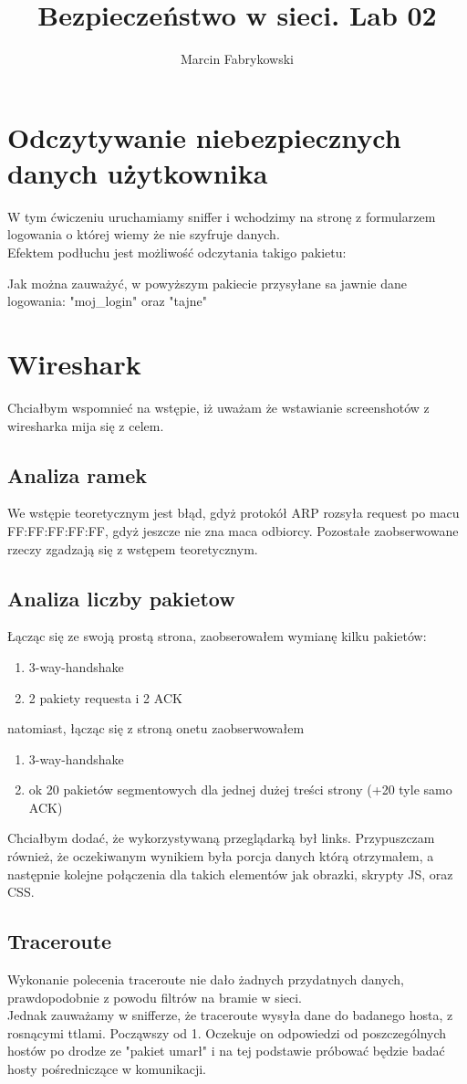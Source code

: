 \documentclass[a4paper,12pt]{article}
\author{Marcin Fabrykowski}
\title{Bezpieczeństwo w sieci. Lab 02}
\date{}
\begin{document}
\maketitle
\newpage
\section{Odczytywanie niebezpiecznych danych użytkownika}
W tym ćwiczeniu uruchamiamy sniffer i wchodzimy na stronę z formularzem logowania o której wiemy że nie szyfruje danych.\\
Efektem podłuchu jest możliwość odczytania takigo pakietu:
\footnotesize

\normalsize
Jak można zauważyć, w powyższym pakiecie przysyłane sa jawnie dane logowania: "moj\_login" oraz "tajne"
\section{Wireshark}
Chciałbym wspomnieć na wstępie, iż uważam że wstawianie screenshotów z wiresharka mija się z celem.\\
\subsection{Analiza ramek}
We wstępie teoretycznym jest błąd, gdyż protokół ARP rozsyła request po macu FF:FF:FF:FF:FF, gdyż jeszcze nie zna maca odbiorcy. Pozostałe zaobserwowane rzeczy zgadzają się z wstępem teoretycznym.
\subsection{Analiza liczby pakietow}
Łącząc się ze swoją prostą strona, zaobserowałem wymianę kilku pakietów:
\begin{enumerate}
\item 3-way-handshake
\item 2 pakiety requesta i 2 ACK
\end{enumerate}
natomiast, łącząc się z stroną onetu zaobserwowałem
\begin{enumerate}
\item 3-way-handshake
\item ok 20 pakietów segmentowych dla jednej dużej treści strony (+20 tyle samo ACK)
\end{enumerate}
Chciałbym dodać, że wykorzystywaną przeglądarką był links. Przypuszczam również, że oczekiwanym wynikiem była porcja danych którą otrzymałem, a następnie kolejne połączenia dla takich elementów jak obrazki, skrypty JS, oraz CSS.
\subsection{Traceroute}
Wykonanie polecenia traceroute nie dało żadnych przydatnych danych, prawdopodobnie z powodu filtrów na bramie w sieci.\\
Jednak zauważamy w snifferze, że traceroute wysyła dane do badanego hosta, z rosnącymi ttlami. Począwszy od 1. Oczekuje on odpowiedzi od poszczególnych hostów po drodze ze "pakiet umarł" i na tej podstawie próbować będzie badać hosty pośredniczące w komunikacji.
\end{document}
